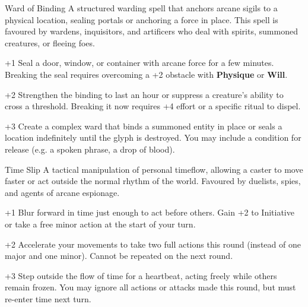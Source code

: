 \begin{WyrdSpell}[Abjuration]{Ward of Binding}
    A structured warding spell that anchors arcane sigils to a physical location, sealing portals or anchoring a force in place. This spell is favoured by wardens, inquisitors, and artificers who deal with spirits, summoned creatures, or fleeing foes.

    \begin{WyrdSpellBlock}
        \item[+1] Seal a door, window, or container with arcane force for a few minutes. Breaking the seal requires overcoming a +2 obstacle with \textbf{Physique} or \textbf{Will}.
        \item[+2] Strengthen the binding to last an hour or suppress a creature’s ability to cross a threshold. Breaking it now requires +4 effort or a specific ritual to dispel.
        \item[+3] Create a complex ward that binds a summoned entity in place or seals a location indefinitely until the glyph is destroyed. You may include a condition for release (e.g. a spoken phrase, a drop of blood).
    \end{WyrdSpellBlock}
\end{WyrdSpell}

\begin{WyrdSpell}[Chronomancy]{Time Slip}
    A tactical manipulation of personal timeflow, allowing a caster to move faster or act outside the normal rhythm of the world. Favoured by duelists, spies, and agents of arcane espionage.

    \begin{WyrdSpellBlock}
        \item[+1] Blur forward in time just enough to act before others. Gain +2 to Initiative or take a free minor action at the start of your turn.
        \item[+2] Accelerate your movements to take two full actions this round (instead of one major and one minor). Cannot be repeated on the next round.
        \item[+3] Step outside the flow of time for a heartbeat, acting freely while others remain frozen. You may ignore all actions or attacks made this round, but must re-enter time next turn.
    \end{WyrdSpellBlock}
\end{WyrdSpell}

